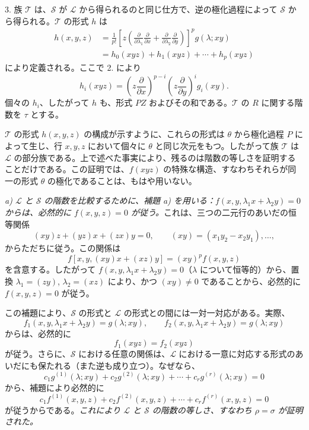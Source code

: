 \documentclass[11pt]{article}
\begin{document}
3. 族 $\mathcal T$ は、$\mathcal S$ が $\mathcal L$ から得られるのと同じ仕方で、逆の極化過程によって $\mathcal S$ から得られる。$\mathcal T$ の形式 $h$ は
\[
\begin{aligned}
 h(x,y,z)
 &=\frac1{p!}\left[z\left(\frac{\partial}{\partial\lambda_1}\frac{\partial}{\partial x}
 +\frac{\partial}{\partial\lambda_2}\frac{\partial}{\partial y}\right)\right]^p g(\lambda;xy)\\
 &=h_0(xyz)+h_1(xyz)+\cdots+h_p(xyz)
\end{aligned}
\]
により定義される。ここで 2. により
\[
  h_i(xyz)=
  \left(z\frac{\partial}{\partial x}\right)^{p-i}
  \left(z\frac{\partial}{\partial y}\right)^i g_i(xy).
\]
個々の $h_i$、したがって $h$ も、形式 $PZ$ およびその和である。$\mathcal T$ の $R$ に関する階数を $\tau$ とする。

$\mathcal T$ の形式 $h(x,y,z)$ の構成が示すように、これらの形式は $\theta$ から極化過程 $P$ によって生じ、行 $x,y,z$ において個々に $\theta$ と同じ次元をもつ。したがって族 $\mathcal T$ は $\mathcal L$ の部分族である。上で述べた事実により、残るのは階数の等しさを証明することだけである。この証明では、$f(xyz)$ の特殊な構造、すなわちそれらが同一の形式 $\theta$ の極化であることは、もはや用いない。

\emph{a) $\mathcal L$ と $\mathcal S$ の階数を比較するために、補題 a) を用いる：$f(x,y,\lambda_1x+\lambda_2y)=0$ からは、必然的に $f(x,y,z)=0$ が従う。}これは、三つの二元行のあいだの恒等関係
\[
  (xy)z+(yz)x+(zx)y=0,
  \qquad (xy)=(x_1y_2-x_2y_1),\ldots,
\]
からただちに従う。この関係は
\[
  f[x,y,(xy)x+(xz)y]=(xy)^p f(x,y,z)
\]
を含意する。したがって $f(x,y,\lambda_1x+\lambda_2y)=0$（$\lambda$ について恒等的）から、置換 $\lambda_1=(zy)$, $\lambda_2=(xz)$ により、かつ $(xy)\ne0$ であることから、必然的に $f(x,y,z)=0$ が従う。

この補題により、$\mathcal S$ の形式と $\mathcal L$ の形式との間には一対一対応がある。実際、
\[
  f_1(x,y,\lambda_1x+\lambda_2y)=g(\lambda;xy),\qquad
  f_2(x,y,\lambda_1x+\lambda_2y)=g(\lambda;xy)
\]
からは、必然的に
\[
  f_1(xyz)=f_2(xyz)
\]
が従う。さらに、$\mathcal S$ における任意の関係は、$\mathcal L$ における一意に対応する形式のあいだにも保たれる（また逆も成り立つ）。なぜなら、
\[
  c_1g^{(1)}(\lambda;xy)+c_2g^{(2)}(\lambda;xy)+\cdots+c_rg^{(r)}(\lambda;xy)=0
\]
から、補題により必然的に
\[
  c_1f^{(1)}(x,y,z)+c_2f^{(2)}(x,y,z)+\cdots+c_rf^{(r)}(x,y,z)=0
\]
が従うからである。\emph{これにより $\mathcal L$ と $\mathcal S$ の階数の等しさ、すなわち $\rho=\sigma$ が証明された。}
\end{document}
